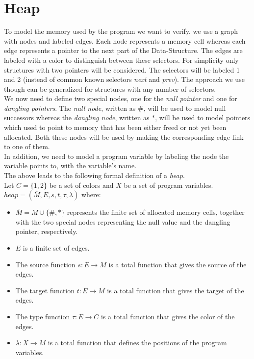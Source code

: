 \newpage
\section{Heap}

To model the memory used by the program we want to verify, we use a graph with nodes and labeled edges.
Each node represents a memory cell whereas each edge represents a pointer to the next part of the Data-Structure.
The edges are labeled with a color to distinguish between these selectors. For simplicity only structures with
two pointers will be considered. The selectors will be labeled 1 and 2 
(instead of common known selectors \textit{next} and \textit{prev}). The approach we use though can be generalized
for structures with any number of selectors.\\
We now need to define two special nodes, one for the \textit{null pointer} and one for \textit{dangling pointers}.
The \textit{null node}, written as $\#$, will be used to model null successors whereas the \textit{dangling node},
written as $*$, will be used to model pointers which used to point to memory that has been either freed or not yet been allocated.
Both these nodes will be used by making the corresponding edge link to one of them.\\
In addition, we need to model a program variable by labeling the node the variable points to, with the variable's name.\\
The above leads to the following formal definition of a \textit{heap}.\\
Let $C = \{1,2\}$ be a set of colors and $X$ be a set of program variables.\\

$heap = (\overline{M}, E, s, t, \tau, \lambda)$ where:

\begin{itemize}
	\item $\overline{M} = M \cup \{\#,*\}$ represents the finite set of allocated memory cells, together with the two special nodes 
		representing the null value and the dangling pointer, respectively.
	\item $E$ is a finite set of edges.
	\item The source function $s : E \rightarrow M$ is a total function that gives the source of the edges.
	\item The target function $t : E \rightarrow M$ is a total function that gives the target of the edges.
	\item The type function $\tau : E \rightarrow C$ is a total function that gives the color of the edges.
	\item $\lambda : X \rightarrow M$ is a total function that defines the positions of the program variables.
\end{itemize}

